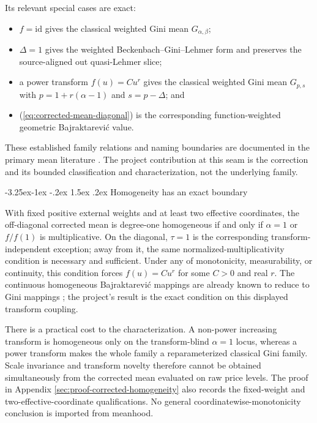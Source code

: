 \documentclass[12pt,a4paper,oneside]{report}
\makeatletter
\renewcommand\subsection{\@startsection{subsection}{2}{\z@}%
  {-3.25ex\@plus -1ex \@minus -.2ex}%
  {1.5ex \@plus .2ex}%
  {\normalfont\fontsize{12}{15}\selectfont\bfseries}}
\makeatother
\begin{document}
Its relevant special cases are exact:

\begin{itemize}
  \item $f=\mathrm{id}$ gives the classical weighted Gini mean
  $G_{\alpha,\beta}$;
  \item $\Delta=1$ gives the weighted Beckenbach--Gini--Lehmer form and
  preserves the source-aligned out quasi-Lehmer slice;
  \item a power transform $f(u)=Cu^r$ gives the classical weighted Gini mean
  $G_{p,s}$ with $p=1+r(\alpha-1)$ and $s=p-\Delta$; and
  \item (\ref{eq:corrected-mean-diagonal}) is the corresponding
  function-weighted geometric Bajraktarevi\'c value.
\end{itemize}

These established family relations and naming boundaries are documented in
the primary mean literature
\citep{matkowskiwrobel2020,palespasteczka2018,palespasteczka2024}. The
project contribution at this seam is the correction and its bounded
classification and characterization, not the underlying family.

\subsection{Homogeneity has an exact boundary}
\label{thm:homogeneity}

With fixed positive external weights and at least two effective coordinates,
the off-diagonal corrected mean is degree-one homogeneous if and only if
$\alpha=1$ or $f/f(1)$ is multiplicative. On the diagonal, $\tau=1$ is the
corresponding transform-independent exception; away from it, the same
normalized-multiplicativity condition is necessary and sufficient. Under any
of monotonicity, measurability, or continuity, this condition forces
$f(u)=Cu^r$ for some $C>0$ and real $r$. The continuous homogeneous
Bajraktarevi\'c mappings are already known to reduce to Gini mappings
\citep{aczeldaroczy1963,palespasteczka2016}; the project's result is the exact
condition on this displayed transform coupling.

There is a practical cost to the characterization. A non-power increasing
transform is homogeneous only on the transform-blind $\alpha=1$ locus, whereas
a power transform makes the whole family a reparameterized classical Gini
family. Scale invariance and transform novelty therefore cannot be obtained
simultaneously from the corrected mean evaluated on raw price levels. The proof
in Appendix \ref{sec:proof-corrected-homogeneity} also records the fixed-weight
and two-effective-coordinate qualifications. No general
coordinatewise-monotonicity conclusion is imported from meanhood.
\end{document}
